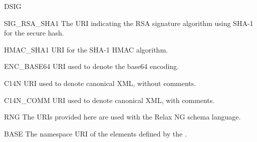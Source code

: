 \documentclass{howto}
\begin{document}
\begin{classdesc*}{DSIG}
  \begin{memberdesc}{SIG_RSA_SHA1}
    The URI indicating the RSA signature algorithm using SHA-1 for the
    secure hash.
  \end{memberdesc}

  \begin{memberdesc}{HMAC_SHA1}
    URI for the SHA-1 HMAC algorithm.
  \end{memberdesc}

  \begin{memberdesc}{ENC_BASE64}
    URI used to denote the base64 encoding.
  \end{memberdesc}

  \begin{memberdesc}{C14N}
    URI used to denote canonical XML, without comments.
  \end{memberdesc}

  \begin{memberdesc}{C14N_COMM}
    URI used to denote canonical XML, with comments.
  \end{memberdesc}
\end{classdesc*}


\begin{classdesc*}{RNG}
  The URIs provided here are used with the Relax NG schema language.

  \begin{memberdesc}{BASE}
    The namespace URI of the elements defined by the
    .
  \end{memberdesc}
\end{classdesc*}
\end{document}
